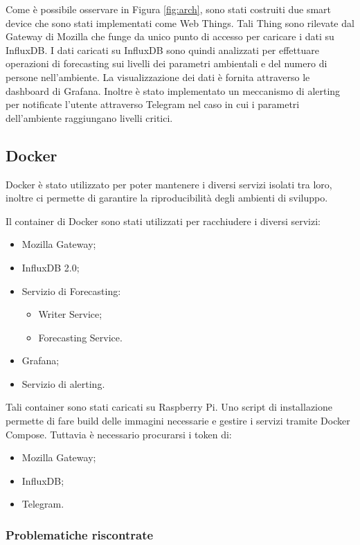 \documentclass{article}
\begin{document}
Come è possibile osservare in Figura \ref{fig:arch}, sono stati costruiti due smart device che sono stati implementati come Web Things. Tali Thing sono rilevate dal  Gateway di Mozilla che funge da unico punto di accesso per caricare i dati su InfluxDB. I dati caricati su InfluxDB sono quindi analizzati per effettuare operazioni di forecasting sui livelli dei parametri ambientali e del numero di persone nell'ambiente. La visualizzazione dei dati è fornita attraverso le dashboard di Grafana. Inoltre è stato implementato un meccanismo di alerting per notificate l'utente attraverso Telegram nel caso in cui i parametri dell'ambiente raggiungano livelli critici.



\subsection{Docker}
Docker è stato utilizzato per poter mantenere i diversi servizi isolati tra loro, inoltre ci permette di garantire la riproducibilità degli ambienti di sviluppo. 
\medskip

Il container di Docker sono stati utilizzati per racchiudere i diversi servizi:
\begin{itemize}
    \item Mozilla Gateway;
    \item InfluxDB 2.0;
    \item Servizio di Forecasting:
    \begin{itemize}
        \item Writer Service;
        \item Forecasting Service.
    \end{itemize}
    \item Grafana;
    \item Servizio di alerting.
\end{itemize}
Tali container sono stati caricati su Raspberry Pi. Uno script di installazione permette di fare build delle immagini necessarie e gestire i servizi tramite Docker Compose. Tuttavia è necessario procurarsi i token di:
\begin{itemize}
    \item Mozilla Gateway;
    \item InfluxDB;
    \item Telegram.
\end{itemize}

\subsubsection{Problematiche riscontrate}
\end{document}
